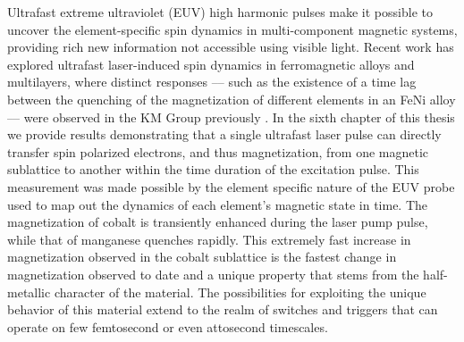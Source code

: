 Ultrafast extreme ultraviolet (EUV) high harmonic pulses make it possible to uncover the element-specific spin dynamics in multi-component magnetic systems, providing rich new information not accessible using visible light. Recent work has explored ultrafast laser-induced spin dynamics in ferromagnetic alloys and multilayers, where distinct responses –– such as the existence of a time lag between the quenching of the magnetization of different elements in an FeNi alloy –– were observed in the KM Group previously \cite{Mathias2012}. In the sixth chapter of this thesis we provide results demonstrating that a single ultrafast laser pulse can directly transfer spin polarized electrons, and thus magnetization, from one magnetic sublattice to another within the time duration of the excitation pulse. This measurement was made possible by the element specific nature of the EUV probe used to map out the dynamics of each element's magnetic state in time. The magnetization of cobalt is transiently enhanced during the laser pump pulse, while that of manganese quenches rapidly. This extremely fast increase in magnetization observed in the cobalt sublattice is the fastest change in magnetization observed to date and a unique property that stems from the half-metallic character of the material. The possibilities for exploiting the unique behavior of this material extend to the realm of switches and triggers that can operate on few femtosecond or even attosecond timescales.
